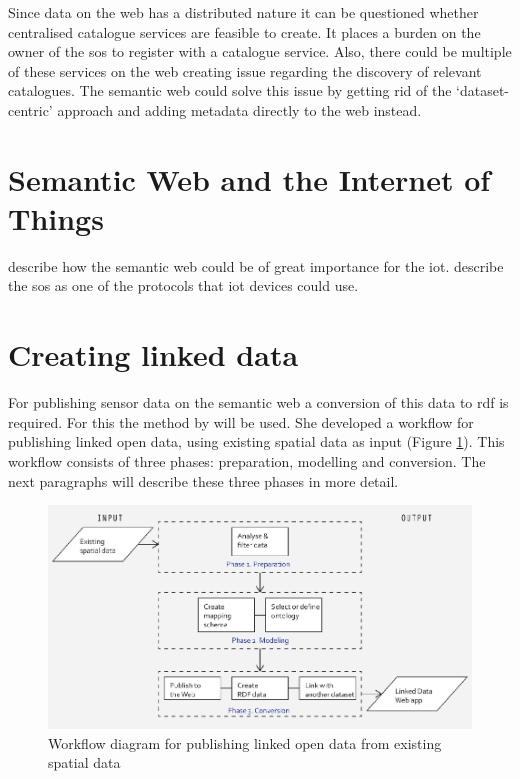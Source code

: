 Since data on the web has a distributed nature it can be questioned whether centralised catalogue services are feasible to create. It places a burden on the owner of the \ac{sos} to register with a catalogue service. Also, there could be multiple of these services on the web creating issue regarding the discovery of relevant catalogues. The semantic web could solve this issue by getting rid of the `dataset-centric' approach and adding metadata directly to the web instead.

\section{Semantic Web and the Internet of Things}
\cite{IOT:Barnaghi} describe how the semantic web could be of great importance for the \ac{iot}.
\cite{IOT:Jazayeri} describe the \ac{sos} as one of the protocols that \ac{iot} devices could use.

\section{Creating linked data}
For publishing sensor data on the semantic web a conversion of this data to \ac{rdf} is required. For this the method by \cite{LD:Missier} will be used. She developed a workflow for publishing linked open data, using existing spatial data as input (Figure \ref{fig:missier}). This workflow consists of three phases: preparation, modelling and conversion. The next paragraphs will describe these three phases in more detail.

\begin{figure}
	\centering
	\includegraphics[width=1\linewidth]{UML/workflowMissier.png}
	\caption{Workflow diagram for publishing linked open data from existing spatial data \citep[p. 28]{LD:Missier}}
	\label{fig:missier}
\end{figure}

